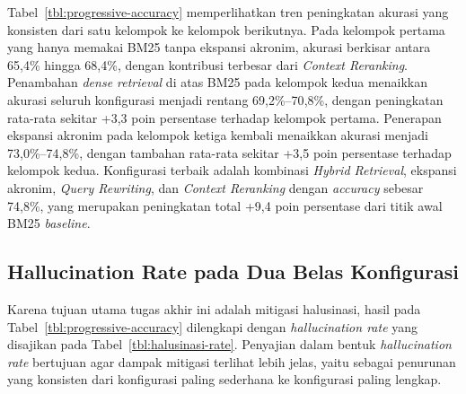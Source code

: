 Tabel~\ref{tbl:progressive-accuracy} memperlihatkan tren peningkatan akurasi yang konsisten dari satu kelompok ke kelompok berikutnya. Pada kelompok pertama yang hanya memakai BM25 tanpa ekspansi akronim, akurasi berkisar antara 65{,}4\% hingga 68{,}4\%, dengan kontribusi terbesar dari \textit{Context Reranking}. Penambahan \textit{dense retrieval} di atas BM25 pada kelompok kedua menaikkan akurasi seluruh konfigurasi menjadi rentang 69{,}2\%--70{,}8\%, dengan peningkatan rata-rata sekitar +3{,}3 poin persentase terhadap kelompok pertama. Penerapan ekspansi akronim pada kelompok ketiga kembali menaikkan akurasi menjadi 73{,}0\%--74{,}8\%, dengan tambahan rata-rata sekitar +3{,}5 poin persentase terhadap kelompok kedua. Konfigurasi terbaik adalah kombinasi \textit{Hybrid Retrieval}, ekspansi akronim, \textit{Query Rewriting}, dan \textit{Context Reranking} dengan \textit{accuracy} sebesar 74{,}8\%, yang merupakan peningkatan total +9{,}4 poin persentase dari titik awal BM25 \textit{baseline}.

\subsection{Hallucination Rate pada Dua Belas Konfigurasi}
\label{subsec:halusinasi-rate}

Karena tujuan utama tugas akhir ini adalah mitigasi halusinasi, hasil pada Tabel~\ref{tbl:progressive-accuracy} dilengkapi dengan \textit{hallucination rate} yang disajikan pada Tabel~\ref{tbl:halusinasi-rate}. Penyajian dalam bentuk \textit{hallucination rate} bertujuan agar dampak mitigasi terlihat lebih jelas, yaitu sebagai penurunan yang konsisten dari konfigurasi paling sederhana ke konfigurasi paling lengkap.

